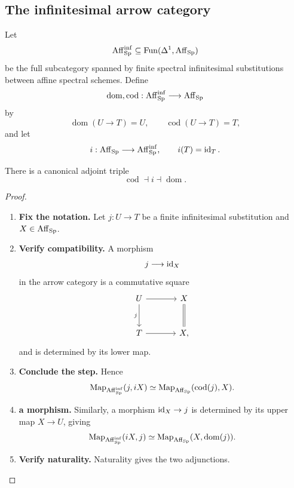 \subsection{The infinitesimal arrow category}

\begin{definition}
\label{def:affine-finite-infinitesimal-category}
Let
\[
    \operatorname{Aff}_{\operatorname{Sp}}^{\inf}
    \subseteq
    \operatorname{Fun}(\Delta^1,\operatorname{Aff}_{\operatorname{Sp}})
\]
be the full subcategory spanned by finite spectral infinitesimal substitutions
between affine spectral schemes. Define
\[
    \operatorname{dom},\operatorname{cod}:
    \operatorname{Aff}_{\operatorname{Sp}}^{\inf}\longrightarrow\operatorname{Aff}_{\operatorname{Sp}}
\]
by
\[
    \operatorname{dom}(U\to T)=U,
    \qquad
    \operatorname{cod}(U\to T)=T,
\]
and let
\[
    i:\operatorname{Aff}_{\operatorname{Sp}}\longrightarrow\operatorname{Aff}_{\operatorname{Sp}}^{\inf},
    \qquad
    i(T)=\operatorname{id}_T.
\]
\end{definition}

\begin{proposition}
\label{prop:infinitesimal-endpoint-adjunctions}
There is a canonical adjoint triple
\[
    \operatorname{cod}\dashv i\dashv\operatorname{dom}.
\]
\end{proposition}

\begin{proof}
\leavevmode
\begin{enumerate}[label=\textup{(\arabic*)}]
    \item \textbf{Fix the notation.}
    Let \(j:U\to T\) be a finite infinitesimal substitution and \(X\in\operatorname{Aff}_{\operatorname{Sp}}\).

    \item \textbf{Verify compatibility.}
    A morphism
    \[
        j\longrightarrow\operatorname{id}_X
    \]
    in the arrow category is a commutative square
    \[
    \begin{tikzcd}[column sep=large, row sep=large]
        U \arrow[r] \arrow[d,"j"']
            & X \arrow[d,equal]
        \\
        T \arrow[r]
            & X,
    \end{tikzcd}
    \]
    and is determined by its lower map.

    \item \textbf{Conclude the step.}
    Hence
    \[
        \operatorname{Map}_{\operatorname{Aff}_{\operatorname{Sp}}^{\inf}}(j,iX)
        \simeq
        \operatorname{Map}_{\operatorname{Aff}_{\operatorname{Sp}}}(\operatorname{cod}(j),X).
    \]

    \item \textbf{a morphism.}
    Similarly, a morphism \(\operatorname{id}_X\to j\) is determined by its upper map \(X\to U\), giving
    \[
        \operatorname{Map}_{\operatorname{Aff}_{\operatorname{Sp}}^{\inf}}(iX,j)
        \simeq
        \operatorname{Map}_{\operatorname{Aff}_{\operatorname{Sp}}}(X,\operatorname{dom}(j)).
    \]

    \item \textbf{Verify naturality.}
    Naturality gives the two adjunctions.
\end{enumerate}
\end{proof}

